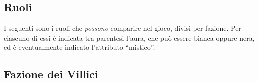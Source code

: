 \documentclass[a4paper,10pt]{article}
\begin{document}
\subsection{Ruoli}
\label{ruoli}


I seguenti sono i ruoli che \emph{possono} comparire nel gioco, divisi per fazione. Per ciascuno di essi è indicata tra parentesi l'aura, che può essere bianca oppure nera, ed è eventualmente indicato l'attributo ``mistico''.

\subsection*{Fazione dei Villici}
\end{document}
